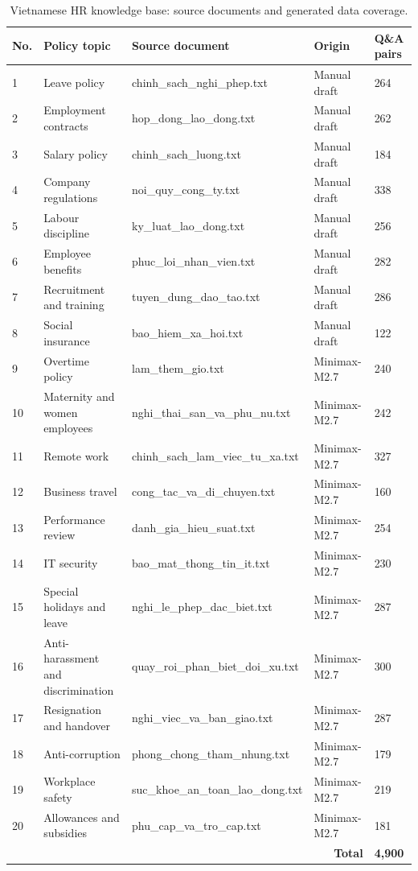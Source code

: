 \documentclass[12pt,a4paper,oneside]{report}
\begin{document}
\begin{table}[H]
\centering
\small
\caption{Vietnamese HR knowledge base: source documents and generated data coverage.}
\label{tab:knowledge-base}
\begin{tabular}{@{}p{0.5cm}p{4.5cm}p{4.5cm}p{2.5cm}p{1.5cm}@{}}
\toprule
No. & Policy topic & Source document & Origin & Q\&A pairs \\
\midrule
1 & Leave policy & chinh\_sach\_nghi\_phep.txt & Manual draft & 264 \\
2 & Employment contracts & hop\_dong\_lao\_dong.txt & Manual draft & 262 \\
3 & Salary policy & chinh\_sach\_luong.txt & Manual draft & 184 \\
4 & Company regulations & noi\_quy\_cong\_ty.txt & Manual draft & 338 \\
5 & Labour discipline & ky\_luat\_lao\_dong.txt & Manual draft & 256 \\
6 & Employee benefits & phuc\_loi\_nhan\_vien.txt & Manual draft & 282 \\
7 & Recruitment and training & tuyen\_dung\_dao\_tao.txt & Manual draft & 286 \\
8 & Social insurance & bao\_hiem\_xa\_hoi.txt & Manual draft & 122 \\
9 & Overtime policy & lam\_them\_gio.txt & Minimax-M2.7 & 240 \\
10 & Maternity and women employees & nghi\_thai\_san\_va\_phu\_nu.txt & Minimax-M2.7 & 242 \\
11 & Remote work & chinh\_sach\_lam\_viec\_tu\_xa.txt & Minimax-M2.7 & 327 \\
12 & Business travel & cong\_tac\_va\_di\_chuyen.txt & Minimax-M2.7 & 160 \\
13 & Performance review & danh\_gia\_hieu\_suat.txt & Minimax-M2.7 & 254 \\
14 & IT security & bao\_mat\_thong\_tin\_it.txt & Minimax-M2.7 & 230 \\
15 & Special holidays and leave & nghi\_le\_phep\_dac\_biet.txt & Minimax-M2.7 & 287 \\
16 & Anti-harassment and discrimination & quay\_roi\_phan\_biet\_doi\_xu.txt & Minimax-M2.7 & 300 \\
17 & Resignation and handover & nghi\_viec\_va\_ban\_giao.txt & Minimax-M2.7 & 287 \\
18 & Anti-corruption & phong\_chong\_tham\_nhung.txt & Minimax-M2.7 & 179 \\
19 & Workplace safety & suc\_khoe\_an\_toan\_lao\_dong.txt & Minimax-M2.7 & 219 \\
20 & Allowances and subsidies & phu\_cap\_va\_tro\_cap.txt & Minimax-M2.7 & 181 \\
\midrule
\multicolumn{4}{r}{\textbf{Total}} & \textbf{4,900} \\
\bottomrule
\end{tabular}
\end{table}
\end{document}

